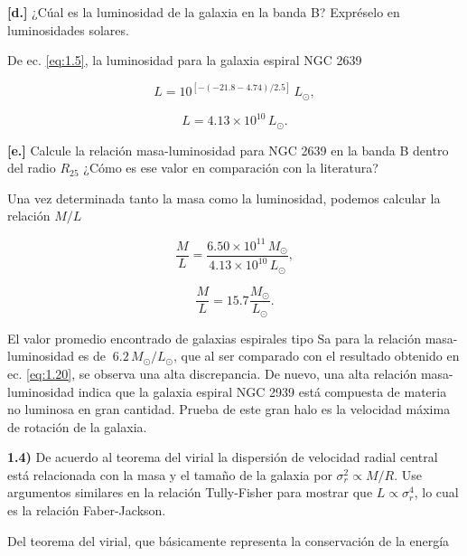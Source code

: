 \documentclass[paper=a4, fontsize=10pt]{scrartcl} %
\begin{document}
{\bf{[d.]}} ¿Cúal  es la luminosidad de la galaxia en la banda B? Expréselo en luminosidades solares.

\vspace{0.4cm}

De ec. \eqref{eq:1.5}, la luminosidad para la galaxia espiral NGC 2639 

$$ L = 10^{[- (-21.8 -4.74)/2.5]} \, L_{\odot},$$

$$L = 4.13 \times 10^{10} \,  L_{\odot}.$$

{\bf{[e.]}} Calcule la relación masa-luminosidad para NGC 2639 en la banda B dentro del radio $R_{25}$ ¿Cómo es ese valor en comparación con la literatura?

\vspace{0.3cm}

Una vez determinada tanto la masa como la luminosidad, podemos calcular la relación $M/L$

\begin{equation*} 
\frac{M}{L} = \frac{6.50 \times 10^{11} \, M_{\odot}}{4.13 \times 10^{10} \, L_{\odot}},
\end{equation*}

\begin{equation} \label{eq:1.20}
\frac{M}{L} = 15.7 \frac{M_{\odot}}{ L_{\odot}}.
\end{equation}

El valor promedio encontrado de galaxias espirales tipo Sa para la relación masa-luminosidad es de $~ 6.2 \, M_{\odot}/L_{\odot}$, que al ser comparado con el resultado obtenido en ec. \eqref{eq:1.20}, se observa una alta discrepancia. De nuevo, una alta relación masa-luminosidad indica que la galaxia espiral NGC 2939 está compuesta de materia no luminosa en gran cantidad. Prueba de este gran halo es la velocidad máxima de rotación de la galaxia. 


\vspace{0.5cm}



{\bf{1.4)}} De acuerdo al teorema del virial la dispersión de velocidad radial central está relacionada con la masa y el tamaño de la galaxia por $\sigma^2_r \propto M/R$. Use argumentos similares en la relación Tully-Fisher para mostrar que $L \propto \sigma^4_r$, lo cual es la relación Faber-Jackson.

\vspace{0.3cm}

Del teorema del virial, que básicamente representa la conservación de la energía 
\end{document}
